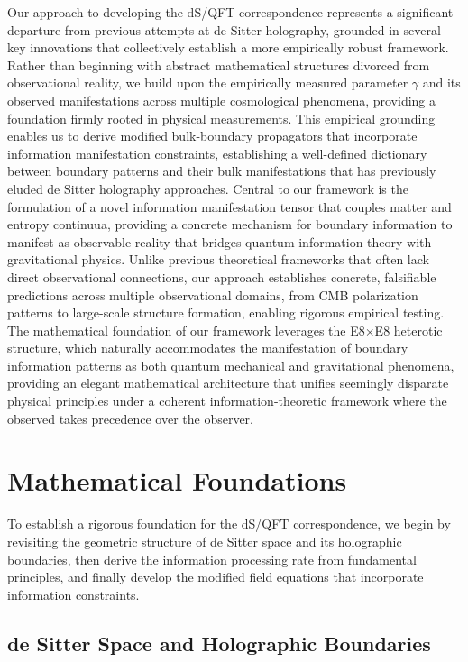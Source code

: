 \documentclass[11pt,english,twoside]{article}
\theoremstyle{plain}
\theoremstyle{definition}
\theoremstyle{remark}
\newcommand{\gammaR}{\gamma}
\begin{document}
Our approach to developing the dS/QFT correspondence represents a significant departure from previous attempts at de Sitter holography, grounded in several key innovations that collectively establish a more empirically robust framework. Rather than beginning with abstract mathematical structures divorced from observational reality, we build upon the empirically measured parameter $\gammaR$ and its observed manifestations across multiple cosmological phenomena, providing a foundation firmly rooted in physical measurements. This empirical grounding enables us to derive modified bulk-boundary propagators that incorporate information manifestation constraints, establishing a well-defined dictionary between boundary patterns and their bulk manifestations that has previously eluded de Sitter holography approaches. Central to our framework is the formulation of a novel information manifestation tensor that couples matter and entropy continuua, providing a concrete mechanism for boundary information to manifest as observable reality that bridges quantum information theory with gravitational physics. Unlike previous theoretical frameworks that often lack direct observational connections, our approach establishes concrete, falsifiable predictions across multiple observational domains, from CMB polarization patterns to large-scale structure formation, enabling rigorous empirical testing. The mathematical foundation of our framework leverages the E8$\times$E8 heterotic structure, which naturally accommodates the manifestation of boundary information patterns as both quantum mechanical and gravitational phenomena, providing an elegant mathematical architecture that unifies seemingly disparate physical principles under a coherent information-theoretic framework where the observed takes precedence over the observer.

\section{Mathematical Foundations}
\label{sec:math}

To establish a rigorous foundation for the dS/QFT correspondence, we begin by revisiting the geometric structure of de Sitter space and its holographic boundaries, then derive the information processing rate from fundamental principles, and finally develop the modified field equations that incorporate information constraints.

\subsection{de Sitter Space and Holographic Boundaries}
\label{subsec:ds_space}
\end{document}

